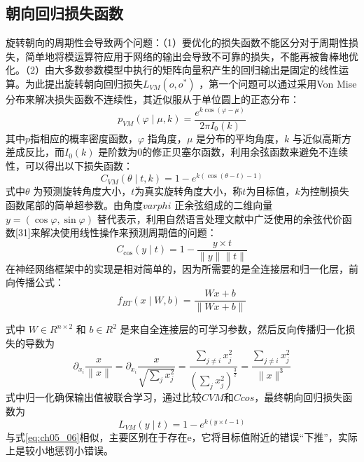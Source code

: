 \subsection{朝向回归损失函数}

旋转朝向的周期性会导致两个问题：（1）要优化的损失函数不能区分对于周期性损失，简单地将模运算符应用于网络的输出会导致不可靠的损失，不能再被鲁棒地优化。（2）由大多数参数模型中执行的矩阵向量积产生的回归输出是固定的线性运算。为此提出旋转朝向回归损失$L_{VM}(o,o^{*})$ ，第一个问题可以通过采用Von Mise 分布\citep{Beyer2015}来解决损失函数不连续性，其近似服从于单位圆上的正态分布：
\begin{equation} \label{eq:ch05_04}
      p_{VM}(\varphi \mid \mu,k)=\frac{e^{k \cos(\varphi-\mu)}}{2\pi I_{0}(k)}
\end{equation} 	                            	  					             
其中$p$指相应的概率密度函数，$\varphi$ 指角度，$\mu $ 是分布的平均角度，$k$ 与近似高斯方差成反比，而$I_{0}(k)$  是阶数为0的修正贝塞尔函数，利用余弦函数来避免不连续性，可以得出以下损失函数：
 \begin{equation} \label{eq:ch05_05}
      C_{VM}(\theta \mid t,k)= 1- e^{k (\cos(\theta-t)-1)}
\end{equation}         			                    
式中$\theta$ 为预测旋转角度大小，$t$为真实旋转角度大小，称$t$为目标值，$k$为控制损失函数尾部的简单超参数。由角度$varphi$ 正余弦组成的二维向量$y=(\cos\varphi,\sin\varphi)$ 替代表示，利用自然语言处理文献中广泛使用的余弦代价函数[31]来解决使用线性操作来预测周期值的问题：
\begin{equation} \label{eq:ch05_06}
     C_{\cos}(y \mid t)=1- \frac{y\times t}{\parallel y\parallel \parallel t\parallel}  
\end{equation}      					               
在神经网络框架中的实现是相对简单的，因为所需要的是全连接层和归一化层，前向传播公式：
\begin{equation} \label{eq:ch05_07}
      f_{BT}(x \mid W,b)=\frac{Wx+b}{\parallel Wx+b \parallel }
\end{equation}  
                     			                    	 
式中 $W\in R^{n\times 2}$ 和 $b\in R^{2}$ 是来自全连接层的可学习参数，然后反向传播归一化损失的导数为
\begin{equation} \label{eq:ch05_08}
      \partial _{x_{i}} \frac{x}{\parallel x\parallel}=\partial _{x_{i}}\frac{x }{\sqrt{\sum_{j}x_j^2}} =\frac{\sum_{j \neq 
 i}x_j^2 }{(\sum_{j}x_j^2)^{\frac{3}{2}}}  =\frac{\sum_{j \neq i}x_j^2 }{\parallel x\parallel^3} 
\end{equation} 	                 			    
式中归一化确保输出值被联合学习，通过比较$CVM$和$Ccos$，最终朝向回归损失函数为
\begin{equation} \label{eq:ch05_09}
      L_{VM}(y\mid t) = 1- e^{k (y\times t-1)}
\end{equation} 	                           								
与式\ref{eq:ch05_06}相似，主要区别在于存在e，它将目标值附近的错误“下推”，实际上是较小地惩罚小错误。

